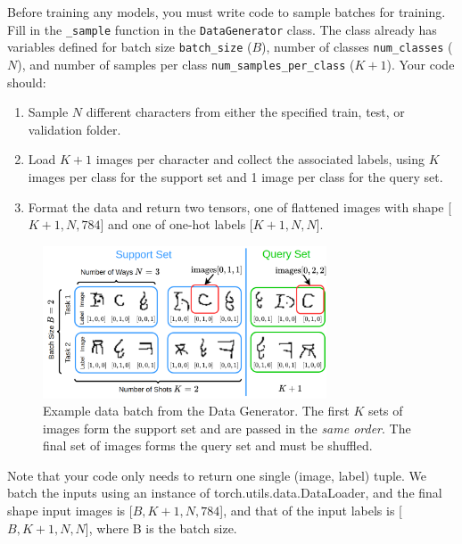\documentclass[12pt]{article}
\begin{document}
Before training any models, you must write code to sample batches for training. Fill in the \texttt{\_sample} function in the \texttt{DataGenerator} class. The class already has variables defined for batch size \texttt{batch\_size} ($B$), number of classes \texttt{num\_classes} ($N$), and number of samples per class \texttt{num\_samples\_per\_class} ($K+1$). Your code should:
\begin{enumerate}
    \item Sample $N$ different characters from either the specified train, test, or validation folder.
    \item Load $K+1$ images per character and collect the associated labels, using $K$ images per class for the support set and 1 image per class for the query set.
    \item Format the data and return two tensors, one of flattened images with shape [$K+1, N, 784$] and one of one-hot labels [$K+1, N, N$].
\end{enumerate}  

\begin{figure}
    \centering
    \includegraphics[width = 0.75\textwidth]{figures/hw1_batch_v4.png}
    \vspace{-0.3cm}
    \caption{\small Example data batch from the Data Generator. The first $K$ sets of images form the support set and are passed in the \emph{same order}. The final set of images forms the query set and must be shuffled.}
    \label{fig:batch}
\end{figure}
Note that your code only needs to return one single (image, label) tuple. We batch the inputs using an instance of torch.utils.data.DataLoader, and the final shape input images is [$B, K+1, N, 784$], and that of the input labels is [$B, K+1, N, N$], where B is the batch size.
\end{document}
